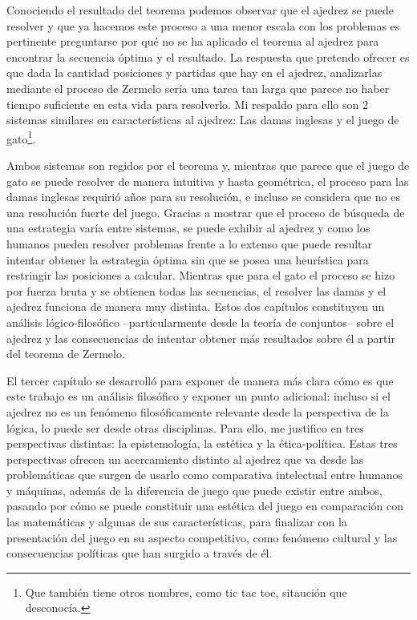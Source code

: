 \documentclass[twoside,openright,12pt,a4paper,spanish]{book}
\begin{document}
Conociendo el resultado del teorema podemos observar que el ajedrez se puede resolver y que ya hacemos este proceso a una menor escala con los problemas es pertinente preguntarse por qué no se ha aplicado el teorema al ajedrez para encontrar la secuencia óptima y el resultado. La respuesta que pretendo ofrecer es que dada la cantidad posiciones y partidas que hay en el ajedrez, analizarlas mediante el proceso de Zermelo sería una tarea tan larga que parece no haber tiempo suficiente en esta vida para resolverlo. Mi respaldo para ello son 2 sistemas similares en características al ajedrez: Las damas inglesas y el juego de gato\footnote{Que tambi\'en tiene otros nombres, como tic tac toe, sitauci\'on que desconoc\'ia.}.

Ambos sistemas son regidos por el teorema y, mientras que parece que el juego de gato se puede resolver de manera intuitiva y hasta geom\'etrica, el proceso para las damas inglesas requiri\'o años para su resolución, e incluso se considera que no es una resolución fuerte del juego. Gracias a mostrar que el proceso de búsqueda de una estrategia varía entre sistemas, se puede exhibir al ajedrez y como los humanos pueden resolver problemas frente a lo extenso que puede resultar intentar obtener la estrategia óptima sin que se posea una heurística para restringir las posiciones a calcular. Mientras que para el gato el proceso se hizo por fuerza bruta y se obtienen todas las secuencias, el resolver las damas y el ajedrez funciona de manera muy distinta. Estos dos capítulos constituyen un análisis lógico-filosófico --particularmente desde la teoría de conjuntos-- sobre el ajedrez y las consecuencias de intentar obtener más resultados sobre él a partir del teorema de Zermelo.

El tercer capítulo se desarrolló para exponer de manera más clara cómo es que este trabajo es un análisis filosófico y exponer un punto adicional: incluso si el ajedrez no es un fenómeno filosóficamente relevante desde la perspectiva de la lógica, lo puede ser desde otras disciplinas. Para ello, me justifico en tres perspectivas distintas: la epistemología, la estética y la ética-política. Estas tres perspectivas ofrecen un acercamiento distinto al ajedrez que va desde las problemáticas que surgen de usarlo como comparativa intelectual entre humanos y máquinas, además de la diferencia de juego que puede existir entre ambos, pasando por cómo se puede constituir una estética del juego en comparación con las matemáticas y algunas de sus características, para finalizar con la presentación del juego en su aspecto competitivo, como fenómeno cultural y las consecuencias políticas que han surgido a través de él.
\end{document}
